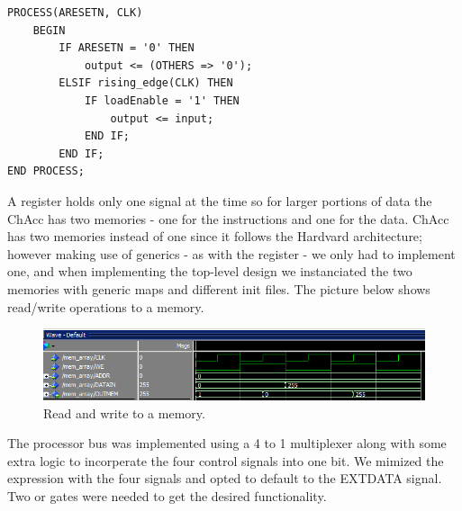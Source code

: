 \documentclass[a4paper,11pt]{article}
\begin{document}
\begin{lstlisting}[frame=single]
PROCESS(ARESETN, CLK)
    BEGIN
        IF ARESETN = '0' THEN
            output <= (OTHERS => '0');
        ELSIF rising_edge(CLK) THEN
            IF loadEnable = '1' THEN
                output <= input;
            END IF;
        END IF;
END PROCESS;
\end{lstlisting}

\noindent
A register holds only one signal at the time so for larger portions of data 
the ChAcc has two memories - one for the instructions and one for the data. 
ChAcc has two memories instead of one since it follows the Hardvard 
architecture; however making use of generics - as with the register - we only 
had to implement one, and when implementing the top-level design we 
instanciated the two memories with generic maps and different init files. 
The picture below shows read/write operations to a memory.

\begin{figure}[h]
    \centering
    \includegraphics[width=\linewidth]{readwritemem.png}
    \caption{Read and write to a memory.}
    \label{Memory}
\end{figure}

\noindent
The processor bus was implemented using a 4 to 1 multiplexer along with some 
extra logic to incorperate the four control signals into one bit. We mimized 
the expression with the four signals and opted to default to the EXTDATA 
signal. Two or gates were needed to get the desired functionality.
\end{document}
